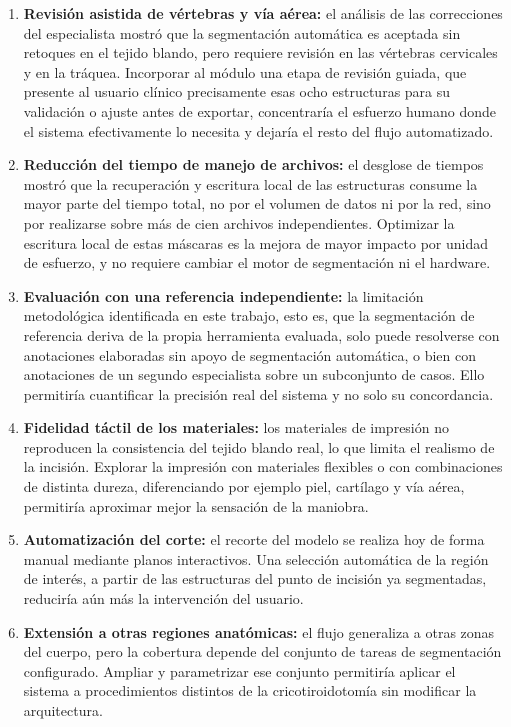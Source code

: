 \begin{enumerate}
  \item \textbf{Revisión asistida de vértebras y vía aérea:} el análisis de las correcciones del especialista mostró que la segmentación automática es aceptada sin retoques en el tejido blando, pero requiere revisión en las vértebras cervicales y en la tráquea. Incorporar al módulo una etapa de revisión guiada, que presente al usuario clínico precisamente esas ocho estructuras para su validación o ajuste antes de exportar, concentraría el esfuerzo humano donde el sistema efectivamente lo necesita y dejaría el resto del flujo automatizado.

  \item \textbf{Reducción del tiempo de manejo de archivos:} el desglose de tiempos mostró que la recuperación y escritura local de las estructuras consume la mayor parte del tiempo total, no por el volumen de datos ni por la red, sino por realizarse sobre más de cien archivos independientes. Optimizar la escritura local de estas máscaras es la mejora de mayor impacto por unidad de esfuerzo, y no requiere cambiar el motor de segmentación ni el hardware.

  \item \textbf{Evaluación con una referencia independiente:} la limitación metodológica identificada en este trabajo, esto es, que la segmentación de referencia deriva de la propia herramienta evaluada, solo puede resolverse con anotaciones elaboradas sin apoyo de segmentación automática, o bien con anotaciones de un segundo especialista sobre un subconjunto de casos. Ello permitiría cuantificar la precisión real del sistema y no solo su concordancia.

  \item \textbf{Fidelidad táctil de los materiales:} los materiales de impresión no reproducen la consistencia del tejido blando real, lo que limita el realismo de la incisión. Explorar la impresión con materiales flexibles o con combinaciones de distinta dureza, diferenciando por ejemplo piel, cartílago y vía aérea, permitiría aproximar mejor la sensación de la maniobra.

  \item \textbf{Automatización del corte:} el recorte del modelo se realiza hoy de forma manual mediante planos interactivos. Una selección automática de la región de interés, a partir de las estructuras del punto de incisión ya segmentadas, reduciría aún más la intervención del usuario.

  \item \textbf{Extensión a otras regiones anatómicas:} el flujo generaliza a otras zonas del cuerpo, pero la cobertura depende del conjunto de tareas de segmentación configurado. Ampliar y parametrizar ese conjunto permitiría aplicar el sistema a procedimientos distintos de la cricotiroidotomía sin modificar la arquitectura.
\end{enumerate}